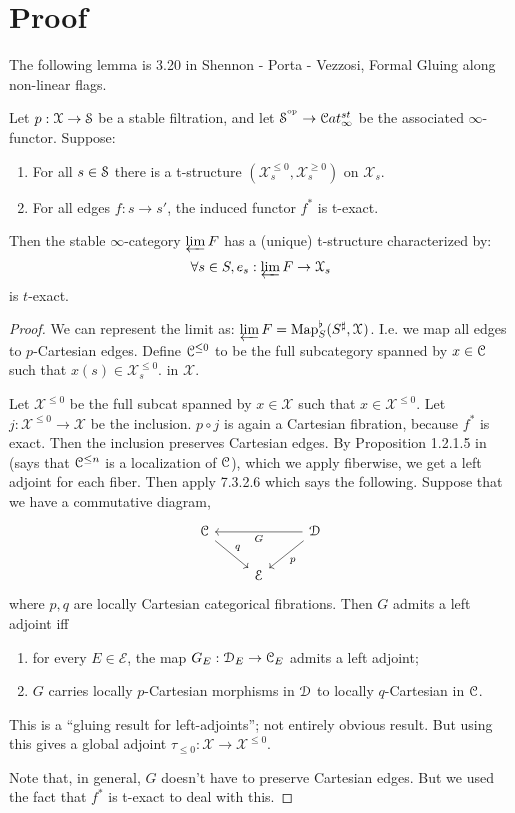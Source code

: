 \section{Proof}
\label{sect:descent_proof}
The following lemma is 3.20 in Shennon - Porta - Vezzosi, Formal Gluing along non-linear
flags. 

\begin{lem}
\label{lem:t_filt}
Let $p : \mathcal{X} \to \mathcal S$ be a stable filtration, and let $\mathcal S^{^\mathrm{op}} \to \mathcal C at_{\infty}^{st}$ be the associated 
$\infty$-functor. Suppose:
\begin{enumerate}
\item For all $s \in \mathcal S$ there is a t-structure $(\mathcal{X}_s^{\leq 0}, \mathcal{X}_s^{\geq 0})$ on $\mathcal{X}_s$.
\item For all edges $f:s \to s'$, the induced functor $f^*$ is t-exact.
\end{enumerate}
Then the stable $\infty$-category $\varprojlim F$ has a (unique) t-structure characterized by:
\[	\forall s \in S, e_s : \varprojlim F \to \mathcal{X}_s 	\]
is $t$-exact.
\end{lem}
\begin{proof}
We can represent the limit as: $\varprojlim F = \operatorname{Map}^{\flat}_S(S^{\sharp},\mathcal{X}^{} )$. 
I.e. we map all edges to $p$-Cartesian edges. Define $\mathcal C^{\leq 0}$ to be the full subcategory spanned by $x \in \mathcal C$ such that
$x(s) \in \mathcal{X}_s^{\leq 0}$.
in $\mathcal{X}$.

Let $\mathcal{X}^{\leq 0}$ be the full subcat spanned by $x \in \mathcal{X}$ such that $x \in \mathcal{X}^{\leq 0}_{}$. Let
$j: \mathcal{X}^{\leq 0} \to \mathcal{X}$ be the inclusion.
$p\circ j$ is again a Cartesian fibration, because $f^*$ is exact. Then the inclusion preserves Cartesian edges.
By Proposition 1.2.1.5 in \cite{Lurie_Higher_algebra} (says that $\mathcal C^{\leq n}$ is a localization of $\mathcal C$), which we apply
fiberwise, we get a left adjoint for each fiber. Then apply \cite{Lurie_Higher_algebra} 7.3.2.6 which says the
following. Suppose that we have
a commutative diagram,
\[
\begin{tikzcd}
\cC\arrow{dr}{q} & & \cD\arrow{ll}{G} \arrow{dl}{p} \\
 & \cE & 
\end{tikzcd}
\]
where $p, q$ are locally Cartesian categorical fibrations. Then $G$ admits a left adjoint iff
\begin{enumerate}
\item for every $E \in \mathcal{E}$, the map $G_E : \mathcal D_E \to \mathcal C_E$ admits a left adjoint;
\item $G$ carries locally $p$-Cartesian morphisms in $\mathcal D$ to locally $q$-Cartesian in $\mathcal C$.
\end{enumerate}
This is a ``gluing result for left-adjoints''; not entirely obvious result. But using this gives a global adjoint
$\tau_{\leq 0} : \mathcal{X} \to \mathcal{X}^{\leq 0}$.

Note that, in general, $G$ doesn't have
to preserve Cartesian edges. But we used the fact that $f^*$ is t-exact to deal with this.
\end{proof}

